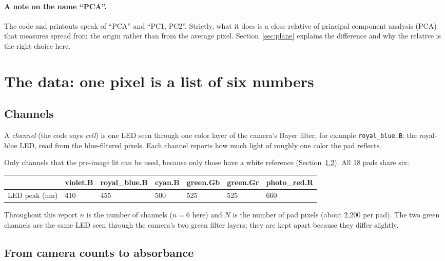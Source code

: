 \documentclass[11pt,letterpaper]{article}
\newcommand{\code}[1]{\texttt{#1}}
\begin{document}
\paragraph{A note on the name ``PCA''.}  The code and printouts speak of
``PCA'' and ``PC1, PC2''.  Strictly, what it does is a close relative of
principal component analysis (PCA) that measures spread from the origin
rather than from the average pixel.  Section~\ref{sec:plane} explains the
difference and why the relative is the right choice here.

\section{The data: one pixel is a list of six numbers}
\label{sec:data}

\subsection{Channels}

A \emph{channel} (the code says \emph{cell}) is one LED seen through one
color layer of the camera's Bayer filter, for example
\code{royal\_blue.B}: the royal-blue LED, read from the blue-filtered
pixels.  Each channel reports how much light of roughly one color the pad
reflects.

Only channels that the pre-image lit can be used, because only those have a
white reference (Section~\ref{sec:absorbance}).  All 18 pads share six:
\begin{center}\small
\begin{tabular}{@{}lllllll@{}}
\toprule
& violet.B & royal\_blue.B & cyan.B & green.Gb & green.Gr & photo\_red.R \\
\midrule
LED peak (nm) & 410 & 455 & 500 & 525 & 525 & 660 \\
\bottomrule
\end{tabular}
\end{center}
Throughout this report $n$ is the number of channels ($n = 6$ here) and $N$
is the number of pad pixels (about 2{,}200 per pad).  The two green channels
are the same LED seen through the camera's two green filter layers; they are
kept apart because they differ slightly.

\subsection{From camera counts to absorbance}
\label{sec:absorbance}
\end{document}
